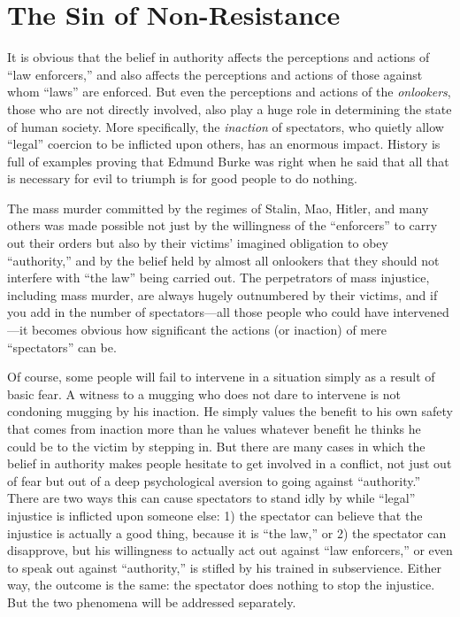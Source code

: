 \documentclass{book}
\begin{document}
\section{The Sin of Non-Resistance}

It is obvious that the belief in authority affects the perceptions and actions of \enquote{law enforcers,} and also affects the perceptions and actions of those against whom \enquote{laws} are enforced. But even the perceptions and actions of the \emph{onlookers}, those who are not directly involved, also play a huge role in determining the state of human society. More specifically, the \emph{inaction} of spectators, who quietly allow \enquote{legal} coercion to be inflicted upon others, has an enormous impact. History is full of examples proving that Edmund Burke was right when he said that all that is necessary for evil to triumph is for good people to do nothing.

The mass murder committed by the regimes of Stalin, Mao, Hitler, and many others was made possible not just by the willingness of the \enquote{enforcers} to carry out their orders but also by their victims' imagined obligation to obey \enquote{authority,} and by the belief held by almost all onlookers that they should not interfere with \enquote{the law} being carried out. The perpetrators of mass injustice, including mass murder, are always hugely outnumbered by their victims, and if you add in the number of spectators---all those people who could have intervened---it becomes obvious how significant the actions (or inaction) of mere \enquote{spectators} can be.

Of course, some people will fail to intervene in a situation simply as a result of basic fear. A witness to a mugging who does not dare to intervene is not condoning mugging by his inaction. He simply values the benefit to his own safety that comes from inaction more than he values whatever benefit he thinks he could be to the victim by stepping in. But there are many cases in which the belief in authority makes people hesitate to get involved in a conflict, not just out of fear but out of a deep psychological aversion to going against \enquote{authority.} There are two ways this can cause spectators to stand idly by while \enquote{legal} injustice is inflicted upon someone else: 1) the spectator can believe that the injustice is actually a good thing, because it is \enquote{the law,} or 2) the spectator can disapprove, but his willingness to actually act out against \enquote{law enforcers,} or even to speak out against \enquote{authority,} is stifled by his trained in subservience. Either way, the outcome is the same: the spectator does nothing to stop the injustice. But the two phenomena will be addressed separately.
\end{document}
